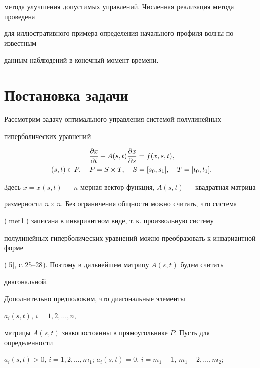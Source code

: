 метода улучшения допустимых управлений. Численная реализация метода проведена 


для иллюстративного примера определения начального профиля волны по известным


данным наблюдений в конечный момент времени.





\section{Постановка задачи}





Рассмотрим задачу оптимального управления системой полулинейных


гиперболических уравнений


\begin{gather}


\label{met1}


\frac{\partial x}{\partial t} +A(s,t)\frac{\partial x}{\partial s}=f(x,s,t),\\


%


(s,t)\in P,\quad P=S\times T,\quad S=[s_0,s_1],\quad T=[t_0,t_1].\notag


\end{gather}


Здесь $x=x(s,t)$ --- $n$-мерная вектор-функция, $A(s,t)$ --- квадратная матрица


размерности $n\times n$. Без ограничения общности можно считать, что система


(\ref{met1}) записана в инвариантном виде, т.\,к. произвольную систему


полулинейных гиперболических уравнений можно преобразовать к инвариантной форме


([5], с.\,25--28). Поэтому в дальнейшем матрицу $A(s,t)$ будем считать


диагональной.





Дополнительно предположим, что диагональные элементы


$a_i(s,t)$, $i=1,2,\dotsc,n$,


матрицы $A(s,t)$ знакопостоянны в прямоугольнике $P$. Пусть для определенности


$a_i(s,t)>0$, $i=1,2,\dotsc,m_1$; $a_i(s,t)=0$, $i=m_1+1$, $m_1+2,\dotsc,m_2$;



